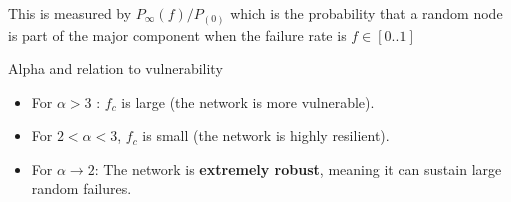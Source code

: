 \documentclass[crop=false]{standalone}
\begin{document}
This is measured by $P_\infty(f)/P_(0)$ which is the probability that a random node is part of the major component when the failure rate is $f\in[0..1]$

Alpha and relation to vulnerability
\begin{itemize}
    \item For $\alpha>3$ : $f_c$ is large (the network is more vulnerable).
    \item For $2<\alpha<3$, $f_c$ is small (the network is highly resilient).
    \item For $\alpha→2$: The network is \textbf{extremely robust}, meaning it can sustain large random failures.
\end{itemize}
\end{document}

